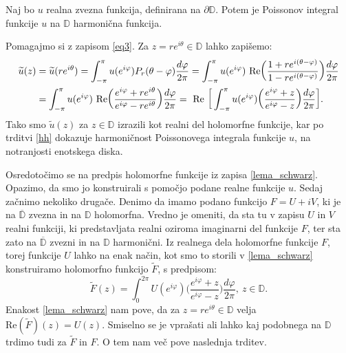 \documentclass[mat1]{fmfdelo}
\begin{document}
     \begin{lema}
        \label{realnidel}
        Naj bo $u$ realna zvezna funkcija, definirana na $\partial \mathbb{D}$. Potem je Poissonov integral funkcije $u$ na $\mathbb{D}$ harmonična funkcija.
     \end{lema}
     \begin{dokaz}
        Pomagajmo si z zapisom \eqref{eq3}. Za $z = re^{i\theta} \in \mathbb{D}$ lahko zapišemo:
            \begin{align}
                \label{lema_schwarz}
                \widetilde{u}(z) &= \widetilde{u}(r e^{i \theta}) = \int_{-\pi}^{\pi}{u(e^{i \varphi}) P_r(\theta - \varphi)\frac{d \varphi}{2 \pi}} = \int_{-\pi}^{\pi}{u(e^{i \varphi})~\text{Re}\bigg(\frac{1+re^{i(\theta - \varphi)}}{1-re^{i(\theta - \varphi)}}\bigg)\frac{d \varphi}{2 \pi}} \notag \\
                &= \int_{-\pi}^{\pi}{u(e^{i \varphi})~\text{Re}\bigg(\frac{e^{i\varphi}+re^{i\theta}}{e^{i\varphi}-re^{i\theta}}\bigg)\frac{d \varphi}{2 \pi}}=~\text{Re}~\bigg[\int_{-\pi}^{\pi}{u(e^{i \varphi})\bigg(\frac{e^{i\varphi}+z}{e^{i\varphi}-z}\bigg)\frac{d \varphi}{2 \pi}}\bigg].
            \end{align}
        Tako smo $\widetilde{u}(z)$ za $z \in \mathbb{D}$ izrazili kot realni del holomorfne funkcije, kar po trditvi \ref{hh} dokazuje harmoničnost Poissonovega integrala funkcije $u$, na notranjosti enotskega diska.
     \end{dokaz}

     Osredotočimo se na predpis holomorfne funkcije iz zapisa \eqref{lema_schwarz}. Opazimo, da smo jo konstruirali s pomočjo podane realne funkcije $u$. 
     Sedaj začnimo nekoliko drugače. Denimo da imamo podano funkcijo $F = U + iV$, ki je na $\overline{\mathbb{D}}$ zvezna in na $\mathbb{D}$ holomorfna. Vredno je omeniti, da sta tu v zapisu $U$ in $V$ realni funkciji, ki predstavljata realni oziroma imaginarni del funkcije $F$, ter sta zato na $\overline{\mathbb{D}}$ zvezni in na $\mathbb{D}$ harmonični.
     Iz realnega dela holomorfne funkcije $F$, torej funkcije $U$ lahko na enak način, kot smo to storili v \eqref{lema_schwarz} konstruiramo holomorfno funkcijo $\widetilde{F}$, s predpisom:
     \begin{equation}
        \label{priprav_schwarz}
        \widetilde{F}(z) = \int_{0}^{2 \pi}{U(e^{i \varphi})\bigg(\frac{e^{i\varphi}+z}{e^{i\varphi}-z}\bigg)\frac{d \varphi}{2 \pi}},~z \in \mathbb{D}.
    \end{equation}
    Enakost \eqref{lema_schwarz} nam pove, da za $z = r e^{i\theta}\in \mathbb{D}$ velja $\text{Re}(\widetilde{F})(z) = U(z)$. Smiselno se je vprašati ali lahko kaj podobnega na $\mathbb{D}$ trdimo tudi za $\widetilde{F}$ in $F$. 
    O tem nam več pove naslednja trditev. 
\end{document}
